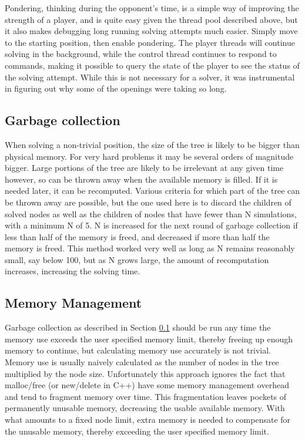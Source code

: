Pondering, thinking during the opponent's time, is a simple way of improving the strength of a player, and is quite easy given the thread pool described above, but it also makes debugging long running solving attempts much easier. Simply move to the starting position, then enable pondering. The player threads will continue solving in the background, while the control thread continues to respond to commands, making it possible to query the state of the player to see the status of the solving attempt. While this is not necessary for a solver, it was instrumental in figuring out why some of the openings were taking so long.


\subsection{Garbage collection}\label{sec:gc}

When solving a non-trivial position, the size of the tree is likely to be bigger than physical memory. For very hard problems it may be several orders of magnitude bigger. Large portions of the tree are likely to be irrelevant at any given time however, so can be thrown away when the available memory is filled. If it is needed later, it can be recomputed. Various criteria for which part of the tree can be thrown away are possible, but the one used here is to discard the children of solved nodes as well as the children of nodes that have fewer than N simulations, with a minimum N of 5. N is increased for the next round of garbage collection if less than half of the memory is freed, and decreased if more than half the memory is freed. This method worked very well as long as N remains reasonably small, say below 100, but as N grows large, the amount of recomputation increases, increasing the solving time.


\subsection{Memory Management}

Garbage collection as described in Section \ref{sec:gc} should be run any time the memory use exceeds the user specified memory limit, thereby freeing up enough memory to continue, but calculating memory use accurately is not trivial. Memory use is usually naively calculated as the number of nodes in the tree multiplied by the node size. Unfortunately this approach ignores the fact that malloc/free (or new/delete in C++) have some memory management overhead and tend to fragment memory over time. This fragmentation leaves pockets of permanently unusable memory, decreasing the usable available memory. With what amounts to a fixed node limit, extra memory is needed to compensate for the unusable memory, thereby exceeding the user specified memory limit.

